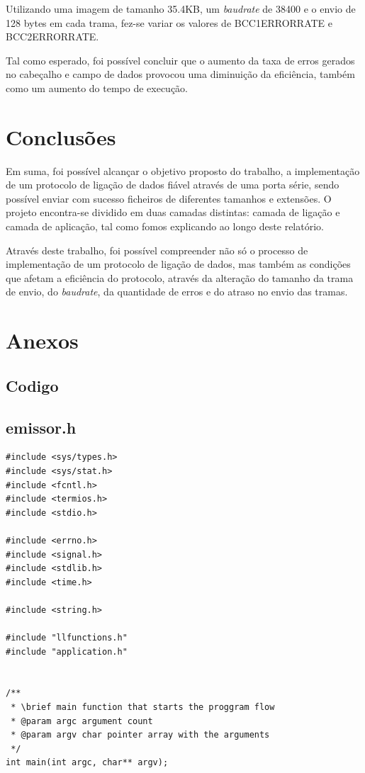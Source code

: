 \documentclass[11pt]{article}
\begin{document}
Utilizando uma imagem de tamanho 35.4KB, um \textit{baudrate} de 38400 e o envio de 128 bytes em cada trama, fez-se variar os valores de BCC1ERRORRATE e BCC2ERRORRATE.

Tal como esperado, foi possível concluir que o aumento da taxa de erros gerados no cabeçalho e campo de dados provocou uma diminuição da eficiência, também como um aumento do tempo de execução.

\section{Conclusões}

Em suma, foi possível alcançar o objetivo proposto do trabalho, a implementação de um protocolo de ligação de dados fiável através de uma porta série, sendo possível enviar com sucesso ficheiros de diferentes tamanhos e extensões. O projeto encontra-se dividido em duas camadas distintas: camada de ligação e camada de aplicação, tal como fomos explicando ao longo deste relatório.

Através deste trabalho, foi possível compreender não só o processo de implementação de um protocolo de ligação de dados, mas também as condições que afetam a eficiência do protocolo, através da alteração do tamanho da trama de envio, do \textit{baudrate}, da quantidade de erros e do atraso no envio das tramas.


\section{Anexos}

\subsection{Codigo}

\subsection{emissor.h}
\begin{lstlisting}[style=CStyle]
#include <sys/types.h>
#include <sys/stat.h>
#include <fcntl.h>
#include <termios.h>
#include <stdio.h>

#include <errno.h>
#include <signal.h>
#include <stdlib.h>
#include <time.h>

#include <string.h>

#include "llfunctions.h"
#include "application.h"


/**
 * \brief main function that starts the proggram flow
 * @param argc argument count
 * @param argv char pointer array with the arguments
 */
int main(int argc, char** argv);

\end{lstlisting}
\end{document}
